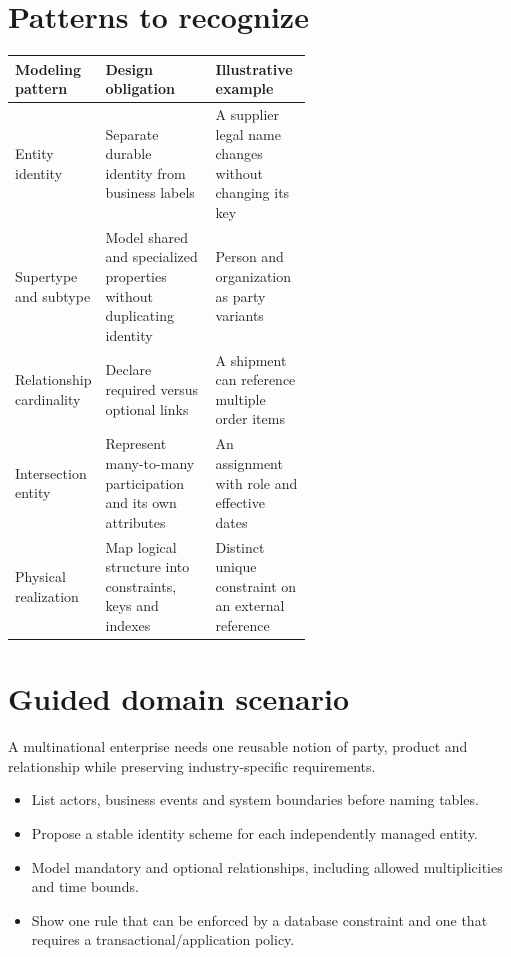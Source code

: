 \documentclass[11pt,letterpaper]{article}
\begin{document}
\section{Patterns to recognize}
\begin{tabularx}{\linewidth}{@{}>{\raggedright\arraybackslash}p{0.22\linewidth} >{\raggedright\arraybackslash}p{0.37\linewidth}>{\raggedright\arraybackslash}X@{}}
\toprule
\textbf{Modeling pattern} & \textbf{Design obligation} & \textbf{Illustrative example} \\ 
\midrule
Entity identity & Separate durable identity from business labels & A supplier legal name changes without changing its key \\ 
Supertype and subtype & Model shared and specialized properties without duplicating identity & Person and organization as party variants \\ 
Relationship cardinality & Declare required versus optional links & A shipment can reference multiple order items \\ 
Intersection entity & Represent many-to-many participation and its own attributes & An assignment with role and effective dates \\ 
Physical realization & Map logical structure into constraints, keys and indexes & Distinct unique constraint on an external reference \\ 
\bottomrule
\end{tabularx}

\section{Guided domain scenario}
A multinational enterprise needs one reusable notion of party, product and relationship while preserving industry-specific requirements.

\begin{itemize}
\item List actors, business events and system boundaries before naming tables.
\item Propose a stable identity scheme for each independently managed entity.
\item Model mandatory and optional relationships, including allowed multiplicities and time bounds.
\item Show one rule that can be enforced by a database constraint and one that requires a transactional/application policy.
\end{itemize}
\end{document}
